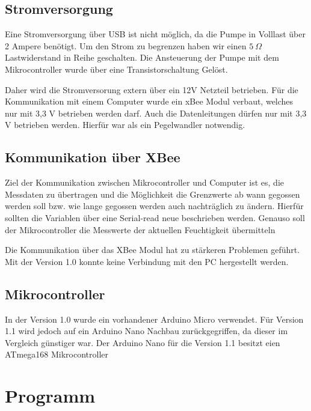 \documentclass[]{IEEEtran}
\begin{document}
		\subsection{Stromversorgung}
		Eine Stromversorgung über USB ist nicht möglich, da die Pumpe in Volllast über 2 Ampere benötigt. Um den Strom zu begrenzen haben wir einen \begin{math}5~\Omega\end{math} Lastwiderstand in Reihe geschalten. Die Ansteuerung der Pumpe mit dem Mikrocontroller wurde über eine Transistorschaltung Gelöst. 

		Daher wird die Stromversorung extern über ein 12V Netzteil betrieben. Für die Kommunikation mit einem Computer wurde ein xBee Modul verbaut, welches nur mit 3,3 V betrieben werden darf. Auch die Datenleitungen dürfen nur mit 3,3 V betrieben werden. Hierfür war als ein Pegelwandler notwendig.
		
		\subsection{Kommunikation über XBee}
		Ziel der Kommunikation zwischen Mikrocontroller und Computer ist es, die Messdaten zu übertragen und die Möglichkeit die Grenzwerte ab wann gegossen werden soll bzw. wie lange gegossen werden auch nachträglich zu ändern. Hierfür sollten die Variablen über eine Serial-read neue beschrieben werden. Genauso soll der Mikrocontroller die Messwerte der aktuellen  Feuchtigkeit übermitteln
		
		Die Kommunikation über das XBee Modul hat zu stärkeren Problemen geführt. Mit der Version 1.0 konnte keine Verbindung mit den PC hergestellt werden.
		
		\subsection{Mikrocontroller}
		In der Version 1.0 wurde ein vorhandener Arduino Micro verwendet. Für Version 1.1 wird jedoch auf ein Arduino Nano Nachbau zurückgegriffen, da dieser im Vergleich günstiger war. Der Arduino Nano für die Version 1.1 besitzt eien ATmega168 Mikrocontroller
	
\section{Programm}
	
\end{document}
